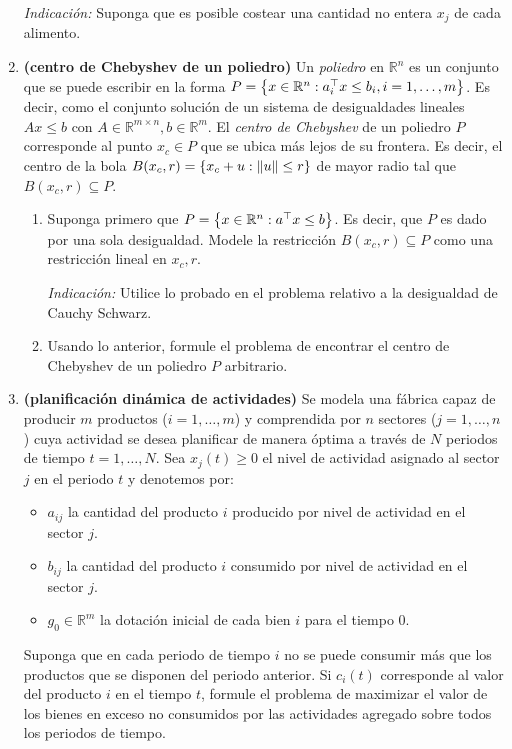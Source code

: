 \documentclass{article}
\begin{document}
\begin{enumerate}
		\textit{Indicación:} Suponga que es posible costear una cantidad no entera \(x_j\) de cada alimento.
	\item \textbf{(centro de Chebyshev de un poliedro)} Un \textit{poliedro} en \(\mathbb{R}^n\) es un conjunto que se puede escribir en la forma \(P = \qty{x \in \mathbb{R}^n : a_i^\top x \leq b_i, i =1, \dots, m}\). Es decir, como el conjunto solución de un sistema de desigualdades lineales \(Ax \leq b\) con \(A \in \mathbb{R}^{m  \times n}, b \in \mathbb{R}^m\). El \textit{centro de Chebyshev} de un poliedro \(P\) corresponde al punto \(x_c \in P\) que se ubica más lejos de su frontera. Es decir, el centro de la bola \(B(x_c, r) = \qty{x_c + u : \norm{u} \leq r}\) de mayor radio tal que \(B(x_c, r) \subseteq P\).
	\begin{enumerate}
		\item Suponga primero que \(P = \qty{x \in \mathbb{R}^n : a^\top x \leq b}\). Es decir, que \(P\) es dado por una sola desigualdad. Modele la restricción \(B(x_c, r) \subseteq P\) como una restricción lineal en \(x_c, r\).
			
			\textit{Indicación:} Utilice lo probado en el problema relativo a la desigualdad de Cauchy Schwarz.
		\item Usando lo anterior, formule el problema de encontrar el centro de Chebyshev de un poliedro \(P\) arbitrario.
	\end{enumerate}
	\item \textbf{(planificación dinámica de actividades)} Se modela una fábrica capaz de producir \(m\) productos (\(i = 1, \dots, m\)) y comprendida por \(n\) sectores (\(j=1, \dots, n\)) cuya actividad se desea planificar de manera óptima a través de \(N\) periodos de tiempo \(t = 1, \dots, N\). Sea \(x_j(t) \geq 0\) el nivel de actividad asignado al sector \(j\) en el periodo \(t\) y denotemos por:
		\begin{itemize}
			\item \(a_{ij}\) la cantidad del producto \(i\) producido por nivel de actividad en el sector \(j\).
			\item \(b_{ij}\) la cantidad del producto \(i\) consumido por nivel de actividad en el sector \(j\).
			\item \(g_0 \in \mathbb{R}^m\) la dotación inicial de cada bien \(i\) para el tiempo \(0\).
		\end{itemize}
		Suponga que en cada periodo de tiempo \(i\) no se puede consumir más que los productos que se disponen del periodo anterior. Si \(c_i(t)\) corresponde al valor del producto \(i\) en el tiempo \(t\), formule el problema de maximizar el valor de los bienes en exceso no consumidos por las actividades agregado sobre todos los periodos de tiempo.


\end{enumerate}
\end{document}
